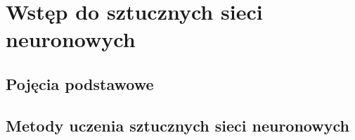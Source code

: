 \chapter{Wstęp do sztucznych sieci neuronowych}
\section{Pojęcia podstawowe}
\section{Metody uczenia sztucznych sieci neuronowych}
